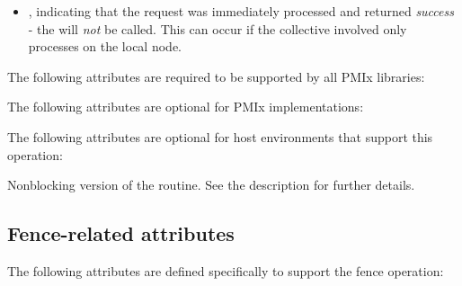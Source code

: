 \returnsimplenb

\returnstart
\begin{itemize}
    \item {}, indicating that the request was immediately processed and returned \textit{success} - the  will \textit{not} be called. This can occur if the collective involved only processes on the local node.
\end{itemize}
\returnend

\reqattrstart
The following attributes are required to be supported by all \ac{PMIx} libraries:


\reqattrend

\optattrstart
The following attributes are optional for \ac{PMIx} implementations:



The following attributes are optional for host environments that support this operation:


\optattrend

\descr

Nonblocking version of the  routine. See the  description for further details.

\subsection{Fence-related attributes}

The following attributes are defined specifically to support the fence operation:

%

